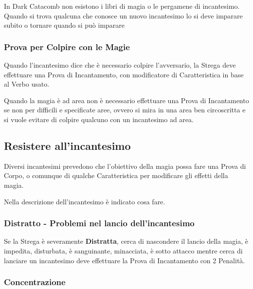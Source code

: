 \documentclass[12pt,a4paper,twoside,openany]{book}
\begin{document}
\begin{multicols}{2}
\begin{narratore}
In Dark Catacomb non esistono i libri di magia o le pergamene di incantesimo. Quando si trova qualcuna che conosce un nuovo incantesimo lo si deve imparare subito o tornare quando si può imparare
\end{narratore}

\subsubsection{Prova per Colpire con le Magie}\label{magietiropercolpireconlemagie}

Quando l'incantesimo dice che è necessario colpire l'avversario, la Strega deve effettuare una Prova di Incantamento, con modificatore di Caratteristica in base al Verbo usato.

\medskip

Quando la magia è ad area non è necessario effettuare una Prova di Incantamento se non per difficili e specificate aree, ovvero si mira in una area ben circoscritta e si vuole evitare di colpire qualcuno con un incantesimo ad area.

\subsection{Resistere all'incantesimo}

Diversi incantesimi prevedono che l'obiettivo della magia possa fare una Prova di Corpo, o comunque di qualche Caratteristica per modificare gli effetti della magia.

Nella descrizione dell'incantesimo è indicato cosa fare.

\subsubsection{Distratto - Problemi nel lancio dell'incantesimo}\label{magiedistratto}

Se la Strega è severamente \textbf{Distratta}, cerca di nascondere il lancio della magia, è impedita, disturbata, è sanguinante, minacciata, è sotto attacco mentre cerca di lanciare un incantesimo deve effettuare la Prova di Incantamento con 2 Penalità.

\subsubsection{Concentrazione}\label{magieconcentrazione}


\end{multicols}
\end{document}
